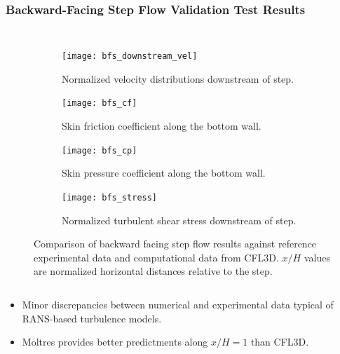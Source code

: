 \begin{frame}[noframenumbering]
  \frametitle{Backward-Facing Step Flow Validation Test Results}
  \begin{columns}
    \column{11.5cm}
    \begin{figure}[htb]
      \centering
      \hfill
      \begin{subfigure}[t]{0.24\columnwidth}
        \centering
        \texttt{[image: bfs\_downstream\_vel]}
        \caption{Normalized velocity distributions downstream of step.}
        \label{fig:bfs-downstream}
      \end{subfigure} %
      \hfill
      \begin{subfigure}[t]{0.24\columnwidth}
        \centering
        \texttt{[image: bfs\_cf]}
        \caption{Skin friction coefficient along the bottom wall.}
        \label{fig:bfs-cf}
      \end{subfigure}
      \hfill
      \begin{subfigure}[t]{0.24\columnwidth}
        \centering
        \texttt{[image: bfs\_cp]}
        \caption{Skin pressure coefficient along the bottom wall.}
        \label{fig:bfs-cp}
      \end{subfigure}%
      \begin{subfigure}[t]{0.24\columnwidth}
        \centering
        \texttt{[image: bfs\_stress]}
        \caption{Normalized turbulent shear stress downstream
        of step.}
        \label{fig:bfs-stress}
      \end{subfigure}
      \caption{Comparison of backward facing step flow results against reference
      experimental data and computational data from CFL3D. $x/H$ values are normalized horizontal
      distances relative to the step.}
      \label{fig:bfs-plots}
    \end{figure}
  \end{columns}
  \begin{itemize}
    \item Minor discrepancies between numerical and experimental data typical of RANS-based turbulence models.
    \item Moltres provides better predictments along $x/H=1$ than CFL3D.
  \end{itemize}
\end{frame}

